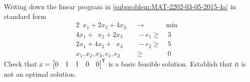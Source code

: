 \begin{subproblem}
    Writing down the linear program in \cref{subproblem:MAT-2202-03-05-2015-4a} in standard form
    \begin{alignat*}{2}
        \phantom{2}x_1 + 2 x_2 + 4x_3 && \to &\min \\
        4x_1 + \phantom{2}x_2 + 2x_3 &&{}- e_1 \geq & \ 3 \\
        2x_1 + 4x_2 + \phantom{4}x_3 &&{}- e_2 \geq & \ 5 \\
        x_1, x_2,x_3,e_1,e_2 &&  \geq & \ 0 
    \end{alignat*}
    Check that $x = \mat{0&1&1&0&0}\tran$ is a basic feasible solution. Establish that it is not an optimal solution.
\end{subproblem}